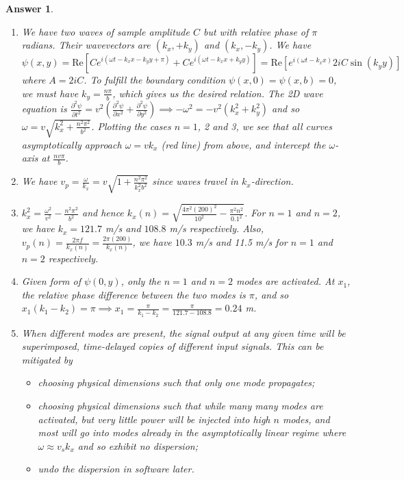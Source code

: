 \documentclass[a4paper]{article}
\newtheorem{ans}{Answer}[subsection]
\theoremstyle{new}
\begin{document}
\begin{ans}\leavevmode
\begin{enumerate}[label=(\roman*)]
\item We have two waves of sample amplitude $C$ but with relative phase of $\pi$ radians. Their wavevectors are $(k_x,+k_y)$ and $(k_x,-k_y)$. We have
$$\psi(x,y)=\text{Re}[Ce^{i(\omega t-k_xx-k_yy+\pi)}+Ce^{i(\omega t-k_xx+k_yy)}]=\text{Re}[e^{i(\omega t-k_xx)}2iC\sin(k_yy)]$$
where $A=2iC$. To fulfill the boundary condition $\psi(x,0)=\psi(x,b)=0$, we must have $k_y=\frac{n\pi}{b}$, which gives us the desired relation. The 2D wave equation is $\frac{\partial^2\psi}{\partial t^2}=v^2(\frac{\partial^2\psi}{\partial x^2}+\frac{\partial^2\psi}{\partial y^2})\implies-\omega^2=-v^2(k_x^2+k_y^2)$ and so $\omega=v\sqrt{k_x^2+\frac{n^2\pi^2}{b^2}}$. Plotting the cases $n=1$, 2 and 3, we see that all curves asymptotically approach $\omega=vk_x$ (red line) from above, and intercept the $\omega$-axis at $\frac{nv\pi}{b}$.
\item We have $v_p=\frac{\omega}{k_x}=v\sqrt{1+\frac{n^2\pi^2}{k_x^2b^2}}$ since waves travel in $k_x$-direction.
\item $k_x^2=\frac{\omega^2}{v^2}-\frac{n^2\pi^2}{b^2}$ and hence $k_x(n)=\sqrt{\frac{4\pi^2(200)^2}{10^2}-\frac{\pi^2n^2}{0.1^2}}$. For $n=1$ and $n=2$, we have $k_x=121.7$ m/s and $108.8$ m/s respectively. Also, $v_p(n)=\frac{2\pi f}{k_x(n)}=\frac{2\pi(200)}{k_x(n)}$, we have $10.3$ m/s and 11.5 m/s for $n=1$ and $n=2$ respectively.
\item Given form of $\psi(0,y)$, only the $n=1$ and $n=2$ modes are activated. At $x_1$, the relative phase difference between the two modes is $\pi$, and so $x_1(k_1-k_2)=\pi\implies x_1=\frac{\pi}{k_1-k_2}=\frac{\pi}{121.7-108.8}=0.24$ m.
\item When different modes are present, the signal output at any given time will be superimposed, time-delayed copies of different input signals. This can be mitigated by
\begin{itemize}
    \item choosing physical dimensions such that only one mode propagates;
    \item choosing physical dimensions such that while many many modes are activated, but very little power will be injected into high $n$ modes, and most will go into modes already in the asymptotically linear regime where $\omega\approx v_sk_x$ and so exhibit no dispersion;
    \item undo the dispersion in software later.
\end{itemize}
\end{enumerate}
\end{ans}
\end{document}
